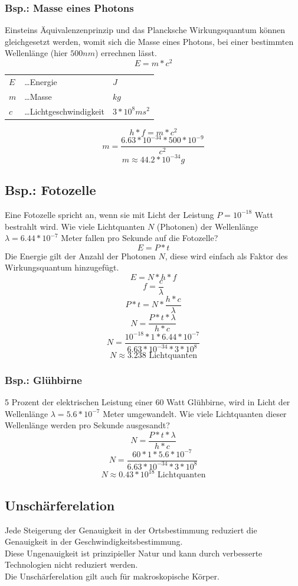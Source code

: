 \documentclass{school}
\begin{document}
\subsubsection{Bsp.: Masse eines Photons}
Einsteins Äquivalenzenprinzip und das Plancksche Wirkungsquantum können gleichgesetzt werden, womit sich die Masse eines Photons, bei einer bestimmten Wellenlänge (hier $500nm$) errechnen lässt.
$$E = m * c^2$$
\begin{center}
    \begin{tabular}{l l l}
        $E$ &\dots Energie & $J$\\
        $m$ &\dots Masse & $kg$\\
        $c$ &\dots Lichtgeschwindigkeit & $3*10^8 {m}{s^2}$
    \end{tabular}
\end{center}
\vspace{0.8 em}
$$h * f = m * c^2$$
$$m = \frac{6.63 * 10^{-34} * 500 * 10^{-9}}{c^2}$$
$$m \approx 44.2 * 10^{-34}g $$

\newpage
\subsection{Bsp.: Fotozelle}
Eine Fotozelle spricht an, wenn sie mit Licht der Leistung $P = 10^{-18}$ Watt bestrahlt wird.
Wie viele Lichtquanten $N$ (Photonen) der Wellenlänge $\lambda = 6.44 * 10^{-7}$ Meter fallen pro Sekunde auf die Fotozelle?
$$E = P * t$$
Die Energie gilt der Anzahl der Photonen $N$, diese wird einfach als Faktor des Wirkungsquantum hinzugefügt.
$$E = N * h* f$$
$$f = \frac{c}{\lambda}$$
$$P * t = N * \frac{h * c}{\lambda}$$
$$N = \frac{P * t * \lambda}{h * c}$$
$$N = \frac{10^{-18} * 1 * 6.44 * 10^{-7}}{6.63 * 10^{-34} * 3 * 10^8}$$
\vspace{0.8 em}
$$N \approx 3.238 \text{ Lichtquanten}$$

\subsubsection{Bsp.: Glühbirne}
5 Prozent der elektrischen Leistung einer 60 Watt Glühbirne, wird in Licht der Wellenlänge $\lambda = 5.6 * 10^{-7}$ Meter umgewandelt.
Wie viele Lichtquanten dieser Wellenlänge werden pro Sekunde ausgesandt?
$$N = \frac{P* t * \lambda}{h * c}$$
$$N = \frac{60 * 1 * 5.6 * 10^{-7}}{6.63 * 10^{-34} * 3 * 10^8}$$
\vspace{0.8 em}
$$N \approx 0.43*10^{18} \text{ Lichtquanten}$$

\newpage
\subsection{Unschärferelation}
Jede Steigerung der Genauigkeit in der Ortsbestimmung reduziert die Genauigkeit in der Geschwindigkeitsbestimmung.
\vspace{0.8 em}\\
Diese Ungenauigkeit ist prinzipieller Natur und kann durch verbesserte Technologien nicht reduziert werden.\\
Die Unschärferelation gilt auch für makroskopische Körper.
\end{document}
